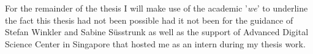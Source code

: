 For the remainder of the thesis I will make use of the academic 
'\emph{we}' to underline the fact this thesis had not been possible had 
it not been for the guidance of Stefan Winkler and Sabine S\"usstrunk as 
well as the support of Advanced Digital Science Center in Singapore that 
hosted me as an intern during my thesis work. 

